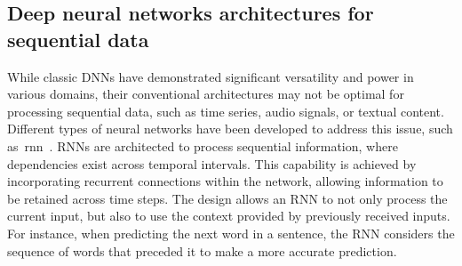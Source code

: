 
\subsection{Deep neural networks architectures for sequential data}
\label{subsec:neural_networks}


While classic DNNs have demonstrated significant versatility and
power in various domains, their conventional architectures may not be optimal 
for processing sequential data, such as time series, audio signals, or textual
content. Different types of neural networks have been developed to address this
issue, such as~\gls*{rnn}~\citep{fausett2006fundamentals, 
medsker2001recurrent, mikolov2014learning}.
RNNs are  architected to process
sequential information, where dependencies exist across temporal intervals. 
This capability is achieved by incorporating recurrent connections within the
network, allowing information to be retained across time steps.
The design allows an RNN to not only process the current input, but also to use
the context provided by previously received inputs. 
For instance, when predicting the next word in a sentence, the RNN considers the
sequence of words that preceded it to make a more accurate prediction.


